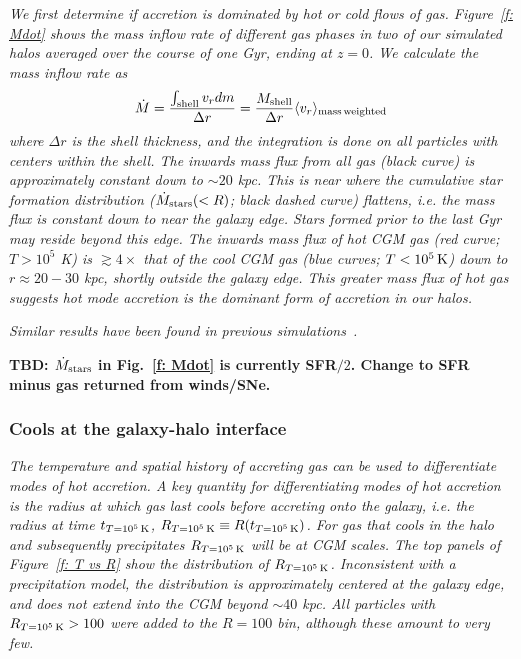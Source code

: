 \documentclass[fleqn,usenatbib]{mnras}
\newcommand{\Rcon}{R_{T=10^5\,{\rm K}}}
\newcommand{\tcon}{t_{T=10^5\,{\rm K}}}
\newcommand{\Mdot}{\dot{M}}
\begin{document}
\textit{
We first determine if accretion is dominated by hot or cold flows of gas.
Figure~\ref{f: Mdot} shows the mass inflow rate of different gas phases in two of our simulated halos averaged over the course of one Gyr, ending at $z=0$.
We calculate the mass inflow rate as
\begin{equation}\label{e: Mdot}
     \Mdot = \frac{\int_{\rm shell} v_r dm}{\Delta r} = \frac{M_{\rm shell}}{\Delta r} \langle v_r\rangle_{\rm mass\, weighted}
\end{equation}
where $\Delta r$ is the shell thickness, and the integration is done on all particles with centers within the shell.
The inwards mass flux from all gas (black curve) is approximately constant down to $\sim 20$ kpc.
This is near where the cumulative star formation distribution ($\dot M_{\rm stars}(<R)$; black dashed curve) flattens, i.e. the mass flux is constant down to near the galaxy edge.
Stars formed prior to the last Gyr may reside beyond this edge.
The inwards mass flux of hot CGM gas (red curve; $T>10^5$ K)  is $\gtrsim 4\times$ that of the cool CGM gas (blue curves; $T < 10^5\,{\rm K}$) down to $r \approx 20-30$ kpc, shortly outside the galaxy edge.
This greater mass flux of hot gas suggests hot mode accretion is the dominant form of accretion in our halos.
}

\textit{
Similar results have been found in previous simulations~\citep[e.g.][]{joung2012a}.
}

\textbf{TBD: $\dot{M}_{\rm stars}$ in Fig.~\ref{f: Mdot} is currently SFR$/2$. Change to SFR minus gas returned from winds/SNe.}


\subsubsection{Cools at the galaxy-halo interface}

\textit{
The temperature and spatial history of accreting gas can be used to differentiate modes of hot accretion.
A key quantity for differentiating modes of hot accretion is the radius at which gas last cools before accreting onto the galaxy, i.e. the radius at time $\tcon$, $\Rcon \equiv R (\tcon)$.
For gas that cools in the halo and subsequently precipitates $\Rcon$ will be at CGM scales.
The top panels of Figure~\ref{f: T vs R} show the distribution of  $\Rcon$.
Inconsistent with a precipitation model, the distribution is approximately centered at the galaxy edge, and does not extend into the CGM beyond $\sim 40$ kpc.
All particles with $\Rcon>100$  were added to the $R=100$ bin, although these amount to very few.
}
\end{document}
